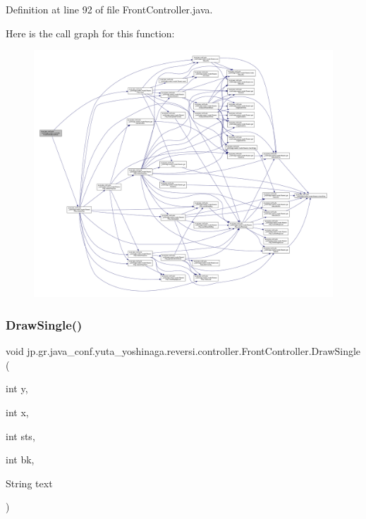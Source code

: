 Definition at line 92 of file Front\+Controller.\+java.

Here is the call graph for this function\+:\nopagebreak
\begin{figure}[H]
\begin{center}
\leavevmode
\includegraphics[width=350pt]{classjp_1_1gr_1_1java__conf_1_1yuta__yoshinaga_1_1reversi_1_1controller_1_1_front_controller_a2f0d63da6e6fc17d2ecf2695af6f8d99_cgraph}
\end{center}
\end{figure}
\mbox{\label{classjp_1_1gr_1_1java__conf_1_1yuta__yoshinaga_1_1reversi_1_1controller_1_1_front_controller_acf079ebc5949ce36b15c56158c9b9cfa}} 
\subsubsection{\texorpdfstring{Draw\+Single()}{DrawSingle()}}
{\footnotesize\ttfamily void jp.\+gr.\+java\+\_\+conf.\+yuta\+\_\+yoshinaga.\+reversi.\+controller.\+Front\+Controller.\+Draw\+Single (\begin{DoxyParamCaption}\item[{int}]{y,  }\item[{int}]{x,  }\item[{int}]{sts,  }\item[{int}]{bk,  }\item[{String}]{text }\end{DoxyParamCaption})}



